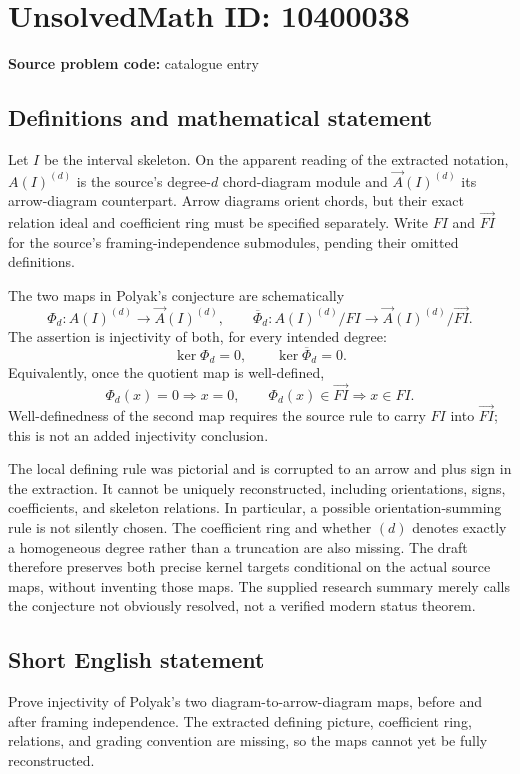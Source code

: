 \documentclass[11pt]{article}
\begin{document}
\section*{UnsolvedMath ID: 10400038}
\textbf{Source problem code:} catalogue entry
\subsection{Definitions and mathematical statement}
Let \(I\) be the interval skeleton. On the apparent reading of the extracted notation, \(A(I)^{(d)}\) is the source's degree-\(d\) chord-diagram module and \(\overrightarrow A(I)^{(d)}\) its arrow-diagram counterpart. Arrow diagrams orient chords, but their exact relation ideal and coefficient ring must be specified separately. Write \(FI\) and \(\overrightarrow{FI}\) for the source's framing-independence submodules, pending their omitted definitions.

The two maps in Polyak's conjecture are schematically
\[
\Phi_d:A(I)^{(d)}\longrightarrow\overrightarrow A(I)^{(d)},
\qquad
\overline\Phi_d:A(I)^{(d)}/FI\longrightarrow
\overrightarrow A(I)^{(d)}/\overrightarrow{FI}.
\]
The assertion is injectivity of both, for every intended degree:
\[
\ker\Phi_d=0,\qquad\ker\overline\Phi_d=0.
\]
Equivalently, once the quotient map is well-defined,
\[
\Phi_d(x)=0\Longrightarrow x=0,
\qquad
\Phi_d(x)\in\overrightarrow{FI}\Longrightarrow x\in FI.
\]
Well-definedness of the second map requires the source rule to carry \(FI\) into \(\overrightarrow{FI}\); this is not an added injectivity conclusion.

The local defining rule was pictorial and is corrupted to an arrow and plus sign in the extraction. It cannot be uniquely reconstructed, including orientations, signs, coefficients, and skeleton relations. In particular, a possible orientation-summing rule is not silently chosen. The coefficient ring and whether \((d)\) denotes exactly a homogeneous degree rather than a truncation are also missing. The draft therefore preserves both precise kernel targets conditional on the actual source maps, without inventing those maps. The supplied research summary merely calls the conjecture not obviously resolved, not a verified modern status theorem.
\subsection{Short English statement}
Prove injectivity of Polyak's two diagram-to-arrow-diagram maps, before and after framing independence. The extracted defining picture, coefficient ring, relations, and grading convention are missing, so the maps cannot yet be fully reconstructed.
\end{document}
